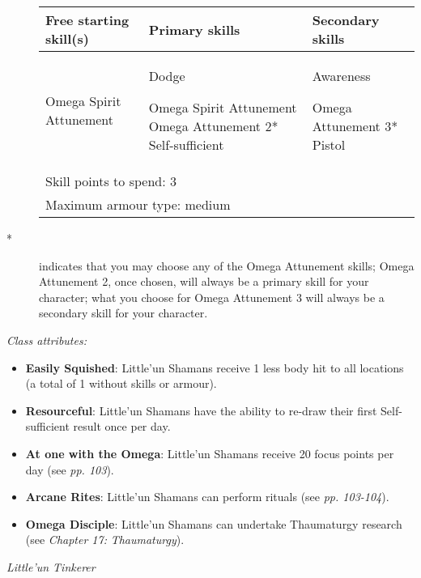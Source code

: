 \documentclass{scrbook}
\begin{document}
\begin{description}
\item[]
\begin{table}
\begin{tabular}{|l|l|l|} \hline 
Free starting skill(s) & Primary skills & Secondary skills \\
 \hline Omega Spirit Attunement & Dodge\par Omega Spirit Attunement Omega Attunement 2* Self-sufficient & Awareness\par Omega Attunement 3* Pistol \\
 \hline \multicolumn{3}{|l|}{Skill points to spend: 3} \\
 \hline \multicolumn{3}{|l|}{Maximum armour type: medium} \\
 \hline \end{tabular}

\end{table}

\item[	*]indicates that you may choose any of the Omega Attunement skills; Omega Attunement 2, once chosen, will always be a primary skill for your character; what you choose for Omega Attunement 3 will always be a secondary skill for your character.

\end{description}

\textit{Class attributes:}

\begin{itemize}
\item \textbf{Easily Squished}: Little'un Shamans receive 1 less body hit to all locations (a total of 1 without skills or armour).

\item \textbf{Resourceful}: Little'un Shamans have the ability to re-draw their first Self-sufficient result once per day.

\item \textbf{At one with the Omega}: Little'un Shamans receive 20 focus points per day (see \textit{pp. 103}).

\item \textbf{Arcane Rites}: Little'un Shamans can perform rituals (see \textit{pp. 103-104}).

\item \textbf{Omega Disciple}: Little'un Shamans can undertake Thaumaturgy research (see \textit{Chapter 17:} \textit{Thaumaturgy}).

\end{itemize}
\textit{Little'un Tinkerer}
\end{document}
